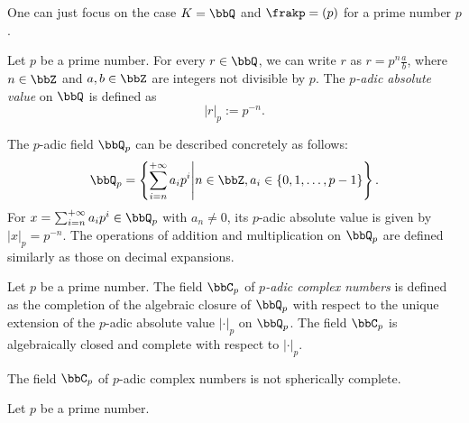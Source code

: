     One can just focus on the case \(K = \bbQ\) and \(\frakp = (p)\) for a prime number \(p\).

    \begin{example}\label{eg:p-adic_field}
        Let \(p\) be a prime number. 
        For every \(r \in \bbQ\), we can write \(r\) as \(r = p^n \frac{a}{b}\), where \(n \in \bbZ\) and \(a,b \in \bbZ\) are integers not divisible by \(p\).
        The \emph{\(p\)-adic absolute value} on \(\bbQ\) is defined as
        \[ |r|_p := p^{-n}. \]
      
        The \(p\)-adic field \(\bbQ_p\) can be described concretely as follows:
        \[ \bbQ_p = \left\{ \sum_{i = n}^{+\infty} a_i p^i \middle| n \in \bbZ, a_i \in \{0, 1, \ldots, p-1\} \right\}. \]
        For \(x = \sum_{i = n}^{+\infty} a_i p^i \in \bbQ_p\) with \(a_n \neq 0\), its \(p\)-adic absolute value is given by \(|x|_p = p^{-n}\).
        The operations of addition and multiplication on \(\bbQ_p\) are defined similarly as those on decimal expansions.
    \end{example}

    \begin{construction}\label{constr:p-adic_complex_number}
        Let \(p\) be a prime number.
        The field \(\bbC_p\) of \emph{\(p\)-adic complex numbers} is defined as the completion of the algebraic closure of \(\bbQ_p\) with respect to the unique extension of the \(p\)-adic absolute value \(|\cdot|_p\) on \(\bbQ_p\).
        The field \(\bbC_p\) is algebraically closed and complete with respect to \(|\cdot|_p\).
    \end{construction}

    \begin{proposition}\label{prop:p-adic_complex_number_is_not_spherically_complete}
        The field \(\bbC_p\) of \(p\)-adic complex numbers is not spherically complete.
    \end{proposition}

    \begin{construction}\label{constr:spherically_complete_p-adic_fields}
        Let \(p\) be a prime number.
    \end{construction}


